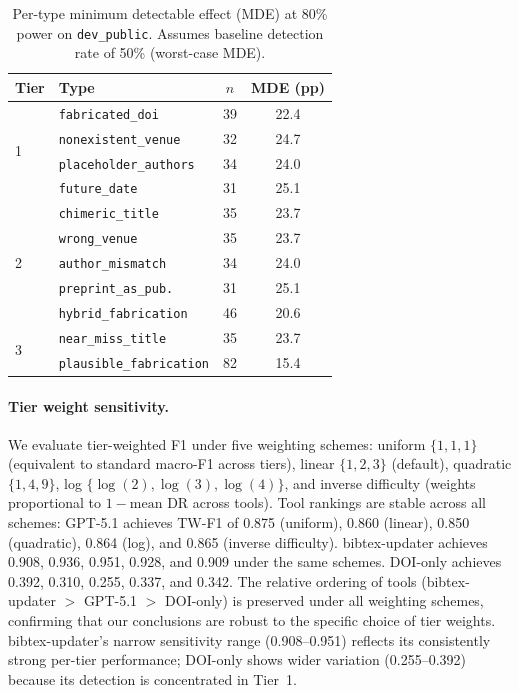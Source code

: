 \begin{table}[t]
\caption{Per-type minimum detectable effect (MDE) at 80\% power on \texttt{dev\_public}. Assumes baseline detection rate of 50\% (worst-case MDE).}
\label{tab:power}
\centering
\small
\begin{tabular}{llcc}
\toprule
\textbf{Tier} & \textbf{Type} & \textbf{$n$} & \textbf{MDE (pp)} \\
\midrule
\multirow{4}{*}{1}
& \texttt{fabricated\_doi}        & 39  & 22.4 \\
& \texttt{nonexistent\_venue}     & 32  & 24.7 \\
& \texttt{placeholder\_authors}   & 34  & 24.0 \\
& \texttt{future\_date}           & 31  & 25.1 \\
\midrule
\multirow{5}{*}{2}
& \texttt{chimeric\_title}        & 35  & 23.7 \\
& \texttt{wrong\_venue}           & 35  & 23.7 \\
& \texttt{author\_mismatch}       & 34  & 24.0 \\
& \texttt{preprint\_as\_pub.}     & 31  & 25.1 \\
& \texttt{hybrid\_fabrication}    & 46  & 20.6 \\
\midrule
\multirow{2}{*}{3}
& \texttt{near\_miss\_title}      & 35  & 23.7 \\
& \texttt{plausible\_fabrication} & 82  & 15.4 \\
\bottomrule
\end{tabular}
\end{table}

\paragraph{Tier weight sensitivity.}
We evaluate tier-weighted F1 under five weighting schemes: uniform $\{1,1,1\}$ (equivalent to standard macro-F1 across tiers), linear $\{1,2,3\}$ (default), quadratic $\{1,4,9\}$, log $\{\log(2), \log(3), \log(4)\}$, and inverse difficulty (weights proportional to $1 - \text{mean DR}$ across tools).
Tool rankings are stable across all schemes: GPT-5.1 achieves TW-F1 of 0.875 (uniform), 0.860 (linear), 0.850 (quadratic), 0.864 (log), and 0.865 (inverse difficulty).
bibtex-updater achieves 0.908, 0.936, 0.951, 0.928, and 0.909 under the same schemes.
DOI-only achieves 0.392, 0.310, 0.255, 0.337, and 0.342.
The relative ordering of tools (bibtex-updater $>$ GPT-5.1 $>$ DOI-only) is preserved under all weighting schemes, confirming that our conclusions are robust to the specific choice of tier weights.
bibtex-updater's narrow sensitivity range (0.908--0.951) reflects its consistently strong per-tier performance; DOI-only shows wider variation (0.255--0.392) because its detection is concentrated in Tier~1.

